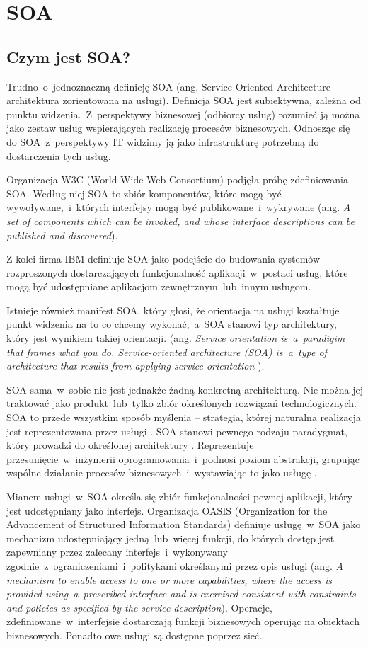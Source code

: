 \section{SOA}
\subsection{Czym jest SOA?}
Trudno~o~jednoznaczną definicję SOA (ang. Service Oriented Architecture – architektura zorientowana na usługi). Definicja SOA jest subiektywna, zależna od punktu widzenia.~Z~perspektywy biznesowej (odbiorcy usług) rozumieć ją można jako zestaw usług wspierających realizację procesów biznesowych. Odnosząc się do SOA~z~perspektywy IT widzimy ją jako infrastrukturę potrzebną do dostarczenia tych usług.
	
Organizacja W3C (World Wide Web Consortium) podjęła próbę zdefiniowania SOA. Według niej SOA to zbiór komponentów, które mogą być wywoływane,~i~których interfejsy mogą być publikowane~i~wykrywane (ang. \emph{A set of components which can be invoked, and whose interface descriptions can be published and discovered}).

Z kolei firma IBM definiuje SOA jako podejście do budowania systemów rozproszonych dostarczających funkcjonalność aplikacji~w~postaci usług, które mogą być udostępniane aplikacjom zewnętrznym~lub~innym usługom. \cite{PlatIntGor}

Istnieje również manifest SOA, który głosi, że orientacja na usługi kształtuje punkt widzenia na to co chcemy wykonać,~a~SOA stanowi typ architektury, który jest wynikiem takiej orientacji. (ang. \emph{Service orientation is~a~paradigim that frames what you do. Service-oriented architecture (SOA) is~a~type of architecture that results from applying service orientation} \cite{SOAManifestoOrg}). 

SOA sama~w~sobie nie jest jednakże żadną konkretną architekturą. Nie można jej traktować jako produkt~lub~tylko zbiór określonych rozwiązań technologicznych. SOA to przede wszystkim sposób myślenia – strategia, której naturalna realizacja jest reprezentowana przez usługi \cite{SOAsdj102009,SOAwJBBC}. SOA stanowi pewnego rodzaju paradygmat, który prowadzi do określonej architektury \cite{SOAsdj102009}. Reprezentuje przesunięcie~w~inżynierii oprogramowania~i~podnosi poziom abstrakcji, grupując wspólne działanie procesów biznesowych~i~wystawiając to jako usługę \cite{CompSOAMet}.
	
Mianem usługi~w~SOA określa się zbiór funkcjonalności pewnej aplikacji, który jest udostępniany jako interfejs. \cite{SOAawidptas} Organizacja OASIS (Organization for the Advancement of Structured Information Standards) definiuje usługę~w~SOA jako mechanizm udostępniający jedną~lub~więcej funkcji, do których dostęp jest zapewniany przez zalecany interfejs~i~wykonywany zgodnie~z~ograniczeniami~i~politykami określanymi przez opis usługi (ang. \emph{A mechanism to enable access to one or more capabilities, where the access is provided using~a~prescribed interface and is exercised consistent with constraints and policies as specified by the service description}). Operacje, zdefiniowane~w~interfejsie dostarczają funkcji biznesowych operując na obiektach biznesowych. Ponadto owe usługi są dostępne poprzez sieć.

